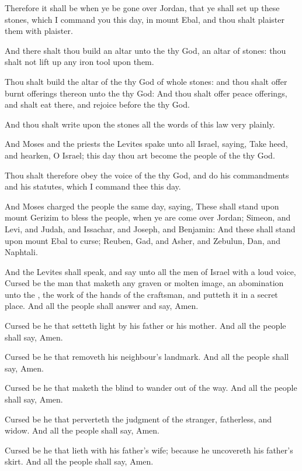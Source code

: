 \Verse Therefore it shall be when ye be gone over Jordan, that ye shall set up these stones, which I command you this day, in mount Ebal, and thou shalt plaister them with plaister.

\Verse And there shalt thou build an altar unto the \LORD thy God, an altar of stones: thou shalt not lift up any iron tool upon them.

\Verse Thou shalt build the altar of the \LORD thy God of whole stones: and thou shalt offer burnt offerings thereon unto the \LORD thy God: \Verse And thou shalt offer peace offerings, and shalt eat there, and rejoice before the \LORD thy God.

\Verse And thou shalt write upon the stones all the words of this law very plainly.

\Verse And Moses and the priests the Levites spake unto all Israel, saying, Take heed, and hearken, O Israel; this day thou art become the people of the \LORD thy God.

\Verse Thou shalt therefore obey the voice of the \LORD thy God, and do his commandments and his statutes, which I command thee this day.

\Verse And Moses charged the people the same day, saying, \Verse These shall stand upon mount Gerizim to bless the people, when ye are come over Jordan; Simeon, and Levi, and Judah, and Issachar, and Joseph, and Benjamin: \Verse And these shall stand upon mount Ebal to curse; Reuben, Gad, and Asher, and Zebulun, Dan, and Naphtali.

\Verse And the Levites shall speak, and say unto all the men of Israel with a loud voice, \Verse Cursed be the man that maketh any graven or molten image, an abomination unto the \LORD, the work of the hands of the craftsman, and putteth it in a secret place. And all the people shall answer and say, Amen.

\Verse Cursed be he that setteth light by his father or his mother. And all the people shall say, Amen.

\Verse Cursed be he that removeth his neighbour's landmark. And all the people shall say, Amen.

\Verse Cursed be he that maketh the blind to wander out of the way. And all the people shall say, Amen.

\Verse Cursed be he that perverteth the judgment of the stranger, fatherless, and widow. And all the people shall say, Amen.

\Verse Cursed be he that lieth with his father's wife; because he uncovereth his father's skirt. And all the people shall say, Amen.


